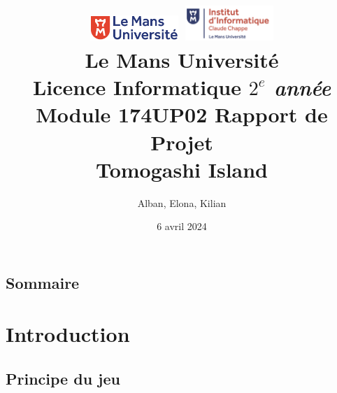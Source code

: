 \documentclass{article}
\begin{document}
\begin{titlepage}
    \title{
        \includegraphics[width=0.25\textwidth]{logolemansU.png}
        \hspace{150pt}
        \includegraphics[width=0.25\textwidth]{logo_IC2.png}
        \\[2cm]
        \color{blue} \textbf{Le Mans Université} \\
        \color{black} Licence Informatique \textit{$2^{e}$ année} \\
        Module 174UP02 Rapport de Projet \\
        \textbf{Tomogashi Island}
    }
    \author{Alban, Elona, Kilian }
    \date{6 avril 2024}
    \maketitle
    
\end{titlepage}


\newpage
\begin{center}
\section*{Sommaire}
\tableofcontents
\end{center}


\newpage
\section{Introduction}
\subsection{Principe du jeu}
\end{document}
